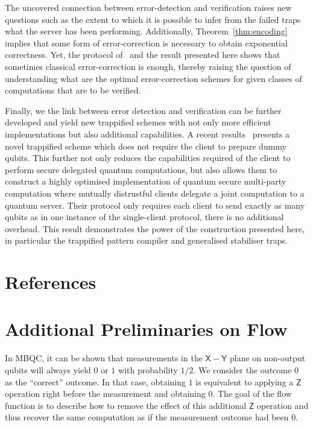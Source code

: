\documentclass[12pt]{iopart}
\newcommand{\cptp}[1]{\mathsf{#1}} \newcommand{\pd}[1]{\mathcal{#1}}  \newcommand{\sch}[1]{\bm{#1}}
\newcommand{\X}{\cptp{X}}
\newcommand{\Z}{\cptp{Z}}
\newcommand{\Y}{\cptp{Y}}
\renewcommand{\1}{\mathds{1}}
\begin{document}
The uncovered connection between error-detection and verification raises new questions such as the extent to which it is possible to infer from the failed traps what the server has been performing.
Additionally, Theorem~\ref{thm:encoding} implies that some form of error-correction is necessary to obtain exponential correctness.
Yet, the protocol of~\cite{LMKO21:verifying} and the result presented here shows that sometimes classical error-correction is enough, thereby raising the question of understanding what are the optimal error-correction schemes for given classes of computations that are to be verified.

Finally, we the link between error detection and verification can be further developed and yield new trappified schemes with not only more efficient implementations but also additional capabilities. A recent results~\cite{KKLM+23:quantum} presents a novel trappified scheme which does not require the client to prepare dummy qubits. This further not only reduces the capabilities required of the client to perform secure delegated quantum computations, but also allows them to construct a highly optimised implementation of quantum secure multi-party computation where mutually distrustful clients delegate a joint computation to a quantum server. Their protocol only requires each client to send exactly as many qubits as in one instance of the single-client protocol, there is no additional overhead. This result demonstrates the power of the construction presented here, in particular the trappified pattern compiler and generalised stabiliser traps.

 


\section*{References}



\appendix


\section{Additional Preliminaries on Flow}
\label{app:flow}
In MBQC, it can be shown that measurements in the $\X - \Y$ plane on non-output qubits will always yield $0$ or $1$ with probability $1/2$. We consider the outcome $0$ as the ``correct'' outcome. In that case, obtaining $1$ is equivalent to applying a $\Z$ operation right before the measurement and obtaining $0$. The goal of the flow function is to describe how to remove the effect of this additional $\Z$ operation and thus recover the same computation as if the measurement outcome had been $0$.
\end{document}

